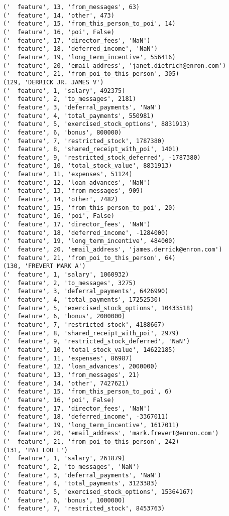 \begin{verbatim}
('  feature', 13, 'from_messages', 63)
('  feature', 14, 'other', 473)
('  feature', 15, 'from_this_person_to_poi', 14)
('  feature', 16, 'poi', False)
('  feature', 17, 'director_fees', 'NaN')
('  feature', 18, 'deferred_income', 'NaN')
('  feature', 19, 'long_term_incentive', 556416)
('  feature', 20, 'email_address', 'janet.dietrich@enron.com')
('  feature', 21, 'from_poi_to_this_person', 305)
(129, 'DERRICK JR. JAMES V')
('  feature', 1, 'salary', 492375)
('  feature', 2, 'to_messages', 2181)
('  feature', 3, 'deferral_payments', 'NaN')
('  feature', 4, 'total_payments', 550981)
('  feature', 5, 'exercised_stock_options', 8831913)
('  feature', 6, 'bonus', 800000)
('  feature', 7, 'restricted_stock', 1787380)
('  feature', 8, 'shared_receipt_with_poi', 1401)
('  feature', 9, 'restricted_stock_deferred', -1787380)
('  feature', 10, 'total_stock_value', 8831913)
('  feature', 11, 'expenses', 51124)
('  feature', 12, 'loan_advances', 'NaN')
('  feature', 13, 'from_messages', 909)
('  feature', 14, 'other', 7482)
('  feature', 15, 'from_this_person_to_poi', 20)
('  feature', 16, 'poi', False)
('  feature', 17, 'director_fees', 'NaN')
('  feature', 18, 'deferred_income', -1284000)
('  feature', 19, 'long_term_incentive', 484000)
('  feature', 20, 'email_address', 'james.derrick@enron.com')
('  feature', 21, 'from_poi_to_this_person', 64)
(130, 'FREVERT MARK A')
('  feature', 1, 'salary', 1060932)
('  feature', 2, 'to_messages', 3275)
('  feature', 3, 'deferral_payments', 6426990)
('  feature', 4, 'total_payments', 17252530)
('  feature', 5, 'exercised_stock_options', 10433518)
('  feature', 6, 'bonus', 2000000)
('  feature', 7, 'restricted_stock', 4188667)
('  feature', 8, 'shared_receipt_with_poi', 2979)
('  feature', 9, 'restricted_stock_deferred', 'NaN')
('  feature', 10, 'total_stock_value', 14622185)
('  feature', 11, 'expenses', 86987)
('  feature', 12, 'loan_advances', 2000000)
('  feature', 13, 'from_messages', 21)
('  feature', 14, 'other', 7427621)
('  feature', 15, 'from_this_person_to_poi', 6)
('  feature', 16, 'poi', False)
('  feature', 17, 'director_fees', 'NaN')
('  feature', 18, 'deferred_income', -3367011)
('  feature', 19, 'long_term_incentive', 1617011)
('  feature', 20, 'email_address', 'mark.frevert@enron.com')
('  feature', 21, 'from_poi_to_this_person', 242)
(131, 'PAI LOU L')
('  feature', 1, 'salary', 261879)
('  feature', 2, 'to_messages', 'NaN')
('  feature', 3, 'deferral_payments', 'NaN')
('  feature', 4, 'total_payments', 3123383)
('  feature', 5, 'exercised_stock_options', 15364167)
('  feature', 6, 'bonus', 1000000)
('  feature', 7, 'restricted_stock', 8453763)

\end{verbatim}
